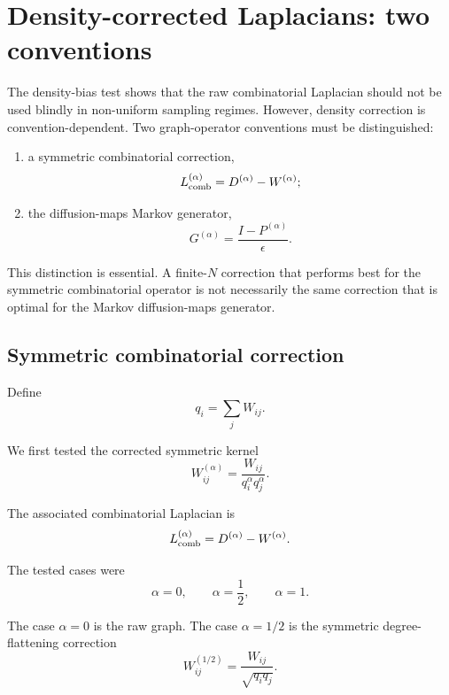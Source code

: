 \documentclass[11pt,a4paper]{article}
\begin{document}
\section{Density-corrected Laplacians: two conventions}

The density-bias test shows that the raw combinatorial Laplacian should not be
used blindly in non-uniform sampling regimes. However, density correction is
convention-dependent. Two graph-operator conventions must be distinguished:

\begin{enumerate}
\item a symmetric combinatorial correction,
\[
L_{\rm comb}^{(\alpha)}
=
D^{(\alpha)}-W^{(\alpha)};
\]

\item the diffusion-maps Markov generator,
\[
G^{(\alpha)}
=
\frac{I-P^{(\alpha)}}{\epsilon}.
\]
\end{enumerate}

This distinction is essential. A finite-\(N\) correction that performs best for
the symmetric combinatorial operator is not necessarily the same correction that
is optimal for the Markov diffusion-maps generator.

\subsection{Symmetric combinatorial correction}

Define
\begin{equation}
q_i=\sum_j W_{ij}.
\end{equation}

We first tested the corrected symmetric kernel
\begin{equation}
W_{ij}^{(\alpha)}
=
\frac{W_{ij}}
{q_i^\alpha q_j^\alpha}.
\end{equation}

The associated combinatorial Laplacian is
\begin{equation}
L_{\rm comb}^{(\alpha)}
=
D^{(\alpha)}-W^{(\alpha)}.
\end{equation}

The tested cases were
\begin{equation}
\alpha=0,\qquad \alpha=\frac12,\qquad \alpha=1.
\end{equation}

The case \(\alpha=0\) is the raw graph. The case \(\alpha=1/2\) is the symmetric
degree-flattening correction
\begin{equation}
W_{ij}^{(1/2)}
=
\frac{W_{ij}}{\sqrt{q_iq_j}}.
\end{equation}
\end{document}
